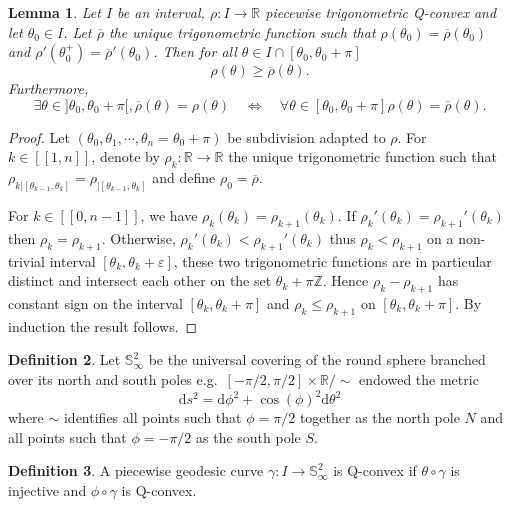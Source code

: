 \documentclass[a4paper,12pt]{article}
\def\ZZ{\mathbb{Z}}
\def\lsem{[\![}
\def\rsem{]\!]}
\def\d{\mathrm{d}}
\def\RR{\mathbb{R}}
\def\SS{\mathbb{S}}
\def\d{\mathrm{d}}
\newcommand{\edt}[1]{{\color{MyDarkRed}{#1}}}
\newtheorem{lem}{Lemma}[section]		 %
\theoremstyle{definition}
\newtheorem{defi}[lem]{Definition}	%
\begin{document}
% 
% 
					\begin{lem}\label{lem:Qconv_trig_ineq}					
					Let $I$ be an interval, $\rho:I \rightarrow \RR$ piecewise trigonometric Q-convex and let $\theta_0 \in I$. Let $\overline \rho$ the unique trigonometric function such that $\rho(\theta_0)=\overline{\rho}(\theta_0)$ and $\rho'(\theta_0^+)=\overline{\rho}'(\theta_0)$.
					Then for all $\theta \in I\cap [\theta_0,\theta_0+\pi]$
					$$\rho(\theta)\geq \overline \rho(\theta).$$
					Furthermore, $$\exists \theta \in ]\theta_0,\theta_0+\pi[,\overline \rho(\theta)=\rho(\theta) \quad \Leftrightarrow \quad  
					\forall \theta \in [\theta_0,\theta_0+\pi] \rho(\theta)=\overline \rho(\theta).$$
					\end{lem}
					\begin{proof}
					 Let $(\theta_0,\theta_1,\cdots,\theta_n=\theta_0+\pi)$ be subdivision adapted to $\rho$.
					 For $k\in \lsem1,n\rsem$, denote by $\rho_k: \RR\rightarrow \RR$ the unique trigonometric function such that
					 $\rho_{k|[\theta_{k-1},\theta_{k}]}=\rho_{|[\theta_{k-1},\theta_{k}]}$ and define $\rho_0=\overline \rho$.

					For $k\in \lsem 0,n-1\rsem$, we have $\rho_k(\theta_k)=\rho_{k+1}(\theta_k)$.
					If $\rho_k'(\theta_k)= \rho_{k+1}'(\theta_k)$ then $\rho_{k}=\rho_{k+1}$.
					Otherwise, $\rho_k'(\theta_k)< \rho_{k+1}'(\theta_k)$ thus $\rho_k<\rho_{k+1}$ on a non-trivial interval
					$[\theta_k,\theta_k+\varepsilon]$, these two trigonometric functions are in particular distinct and intersect each other on the set $\theta_k+\pi\ZZ$. Hence $\rho_k-\rho_{k+1}$ has constant sign on the interval $[\theta_k,\theta_k+\pi]$ and 
					$\rho_k\leq \rho_{k+1}$ on $[\theta_k,\theta_k+\pi]$. By induction the result follows.
					\end{proof}
	


					\begin{defi} Let $\SS^2_\infty$ be the universal covering of the round sphere branched over its north and south poles e.g.\ $[-\pi/2,\pi/2]\times \RR /\sim$ endowed the metric $$\d s^2 = \d \phi^2 +\cos(\phi)^2\d \theta^2$$ 
					where $\sim$ identifies all points such that $\phi=\pi/2$ together as the north pole $N$ and all points such that $\phi=-\pi/2$ as the south pole $S$.
					\end{defi}
					\begin{defi} A piecewise geodesic curve $\gamma: I\rightarrow \SS^2_\infty$ is Q-convex if $\theta\circ \gamma$ is injective and $\phi\circ \gamma$ is Q-convex.

					\end{defi}
\end{document}
